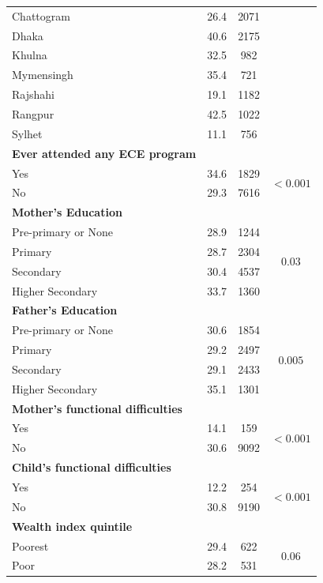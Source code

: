\documentclass[
  12pt,
  oneside]{report}
\begin{document}
\begin{longtable}{lccc}
Chattogram & 26.4 & 2071 &  \\*
Dhaka & 40.6 & 2175 &  \\*
Khulna & 32.5 & 982 &  \\*
Mymensingh & 35.4 & 721 &  \\*
Rajshahi & 19.1 & 1182 &  \\*
Rangpur & 42.5 & 1022 &  \\*
Sylhet & 11.1 & 756 &  \\
\textbf{Ever attended any ECE program} & \multicolumn{1}{l}{} & \multicolumn{1}{l}{} & \multicolumn{1}{l}{} \\*
Yes & 34.6 & 1829 & \multirow{2}{*}{$<0.001 $} \\*
No & 29.3 & 7616 &  \\
\textbf{Mother's Education} & \multicolumn{1}{l}{} & \multicolumn{1}{l}{} & \multicolumn{1}{l}{} \\*
Pre-primary or None & 28.9 & 1244 & \multirow{4}{*}{$0.03$} \\*
Primary & 28.7 & 2304 &  \\*
Secondary & 30.4 & 4537 &  \\*
Higher Secondary & 33.7 & 1360 &  \\
\textbf{Father's Education} & \multicolumn{1}{l}{} & \multicolumn{1}{l}{} & \multicolumn{1}{l}{} \\*
Pre-primary or None & 30.6 & 1854 & \multirow{4}{*}{$0.005$} \\*
Primary & 29.2 & 2497 &  \\*
Secondary & 29.1 & 2433 &  \\*
Higher Secondary & 35.1 & 1301 &  \\
\textbf{Mother's functional difficulties} & \multicolumn{1}{l}{} & \multicolumn{1}{l}{} & \multicolumn{1}{l}{} \\*
Yes & 14.1 & 159 & \multirow{2}{*}{$<0.001$} \\*
No & 30.6 & 9092 &  \\
\textbf{Child's functional difficulties} & \multicolumn{1}{l}{} & \multicolumn{1}{l}{} & \multicolumn{1}{l}{} \\*
Yes & 12.2 & 254 & \multirow{2}{*}{$<0.001$} \\*
No & 30.8 & 9190 &  \\
\textbf{Wealth index quintile} & \multicolumn{1}{l}{} & \multicolumn{1}{l}{} & \multicolumn{1}{l}{} \\*
Poorest & 29.4 & 622 & \multirow{5}{*}{$0.06$} \\*
Poor & 28.2 & 531 &  \\*

\end{longtable}
\end{document}
